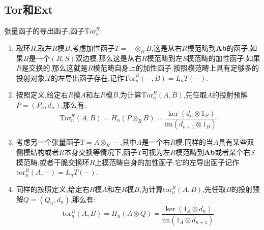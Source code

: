 \subsection{Tor和Ext}

张量函子的导出函子,函子$\mathrm{Tor}_n^R$.
\begin{enumerate}
	\item 取环$R$,取左$R$模$B$,考虑加性函子$T=-\otimes_RB$,这是从右$R$模范畴到\textbf{Ab}的函子,如果$B$是一个$(R,S)$双边模,那么这是从右$R$模范畴到左$S$模范畴的加性函子.如果$R$是交换的,那么这就是$R$模范畴自身上的加性函子.按照模范畴上具有足够多的投射对象,$T$的左导出函子存在,记作$\mathrm{Tor}_n^R(-,B)=L_nT(-)$.
	\item 按照定义,给定右$R$摸$A$和左$R$模$B$,为计算$\mathrm{Tor}_n^R(A,B)$,先任取$A$的投射预解$P=(P_n,d_n)$,那么有:
	$$\mathrm{Tor}_n^R(A,B)=H_n(P\otimes_RB)=\frac{\ker(d_n\otimes1_B)}{\mathrm{im}(d_{n+1}\otimes1_B)}$$
	\item 考虑另一个张量函子$T=A\otimes_R-$,其中$A$是一个右$R$模.同样的当$A$具有某些双侧模结构或者$R$本身交换等情况下,函子$T$可视为左$R$模范畴到\textbf{Ab}或者某个右$S$模范畴,或者干脆交换环$R$上模范畴自身的加性函子.它的左导出函子记作$\mathrm{tor}_n^R(A,-)=L_nT(-)$.
	\item 同样的按照定义,给定右$R$模$A$和左$R$模$B$,为计算$\mathrm{tor}_n^R(A,B)$,先任取$B$的投射预解$Q=(Q_n,d_n)$,那么有:
	$$\mathrm{tor}_n^R(A,B)=H_n(A\otimes Q)=\frac{\ker(1_A\otimes d_n)}{\mathrm{im}(1_A\otimes d_{n+1})}$$
\end{enumerate}


